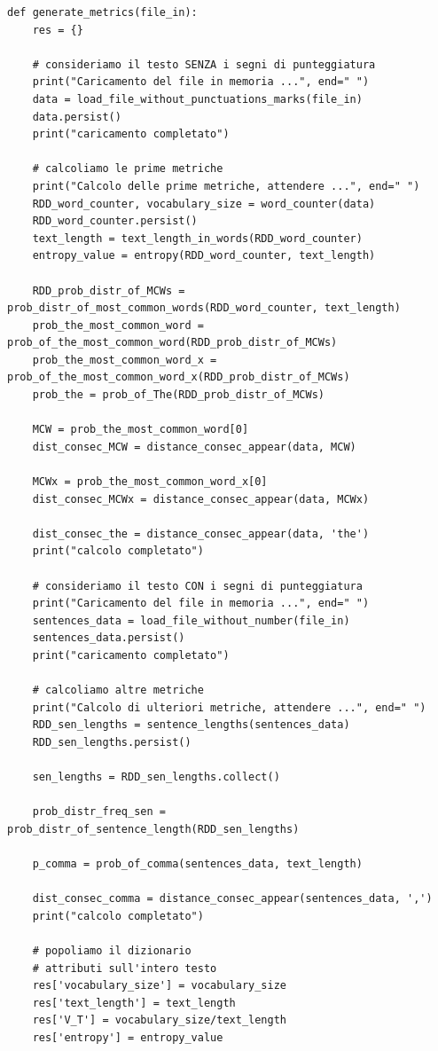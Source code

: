 \documentclass[titlepage]{article}
\begin{document}
\begin{verbatim}
def generate_metrics(file_in):
    res = {}
    
    # consideriamo il testo SENZA i segni di punteggiatura
    print("Caricamento del file in memoria ...", end=" ")
    data = load_file_without_punctuations_marks(file_in)
    data.persist()
    print("caricamento completato")

    # calcoliamo le prime metriche
    print("Calcolo delle prime metriche, attendere ...", end=" ")
    RDD_word_counter, vocabulary_size = word_counter(data)
    RDD_word_counter.persist()
    text_length = text_length_in_words(RDD_word_counter)
    entropy_value = entropy(RDD_word_counter, text_length)
    
    RDD_prob_distr_of_MCWs = prob_distr_of_most_common_words(RDD_word_counter, text_length)
    prob_the_most_common_word = prob_of_the_most_common_word(RDD_prob_distr_of_MCWs)
    prob_the_most_common_word_x = prob_of_the_most_common_word_x(RDD_prob_distr_of_MCWs)
    prob_the = prob_of_The(RDD_prob_distr_of_MCWs)

    MCW = prob_the_most_common_word[0]
    dist_consec_MCW = distance_consec_appear(data, MCW)
    
    MCWx = prob_the_most_common_word_x[0]
    dist_consec_MCWx = distance_consec_appear(data, MCWx)
    
    dist_consec_the = distance_consec_appear(data, 'the')
    print("calcolo completato")

    # consideriamo il testo CON i segni di punteggiatura
    print("Caricamento del file in memoria ...", end=" ")
    sentences_data = load_file_without_number(file_in)
    sentences_data.persist()
    print("caricamento completato")
    
    # calcoliamo altre metriche
    print("Calcolo di ulteriori metriche, attendere ...", end=" ")
    RDD_sen_lengths = sentence_lengths(sentences_data)
    RDD_sen_lengths.persist()

    sen_lengths = RDD_sen_lengths.collect()

    prob_distr_freq_sen = prob_distr_of_sentence_length(RDD_sen_lengths)

    p_comma = prob_of_comma(sentences_data, text_length)

    dist_consec_comma = distance_consec_appear(sentences_data, ',')
    print("calcolo completato")
    
    # popoliamo il dizionario
    # attributi sull'intero testo
    res['vocabulary_size'] = vocabulary_size
    res['text_length'] = text_length
    res['V_T'] = vocabulary_size/text_length
    res['entropy'] = entropy_value
    

\end{verbatim}
\end{document}
